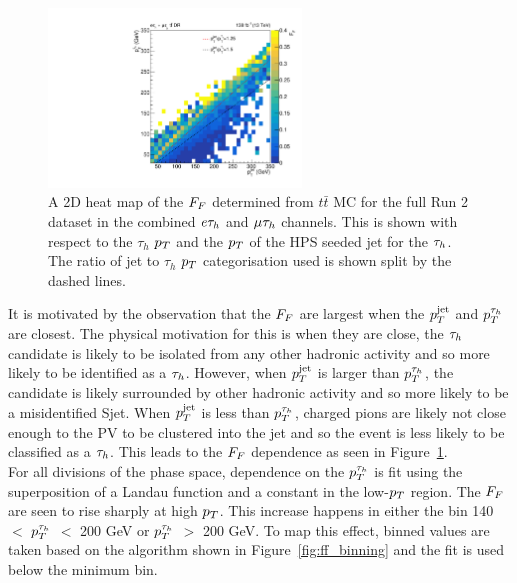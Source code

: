 \begin{figure}[t]
\centering
    \includegraphics[width=0.6\textwidth]{Figures/ff_colz_ttbar_lt_v2.pdf}
\caption[Plot of the reliance of the fake factors on the ratio of the $\tauh$ and jet $\pT$.]{A 2D heat map of the $F_{F}$ determined from $t\bar{t}$ MC for the full Run 2 dataset in the combined $e\tau_{h}$ and $\mu\tau_{h}$ channels. This is shown with respect to the $\tau_h$ $\pT$ and the $\pT$ of the HPS seeded jet for the $\tauh$. The ratio of jet to $\tau_h$ $\pT$ categorisation used is shown split by the dashed lines.}
\label{fig:ff_colz}
\end{figure}

It is motivated by the observation that the $F_{F}$ are largest when the $p_{T}^{\text{jet}}$ and $p_{T}^{\tau_{h}}$ are closest.
The physical motivation for this is when they are close, the $\tauh$ candidate is likely to be isolated from any other hadronic activity and so more likely to be identified as a $\tauh$.
However, when $p_{T}^{\text{jet}}$ is larger than $p_{T}^{\tau_{h}}$, the candidate is likely surrounded by other hadronic activity and so more likely to be a misidentified Sjet.
When $p_{T}^{\text{jet}}$ is less than $p_{T}^{\tau_{h}}$, charged pions are likely not close enough to the \ac{PV} to be clustered into the jet and so the event is less likely to be classified as a $\tauh$. 
This leads to the $F_{F}$ dependence as seen in Figure~\ref{fig:ff_colz}.\\

For all divisions of the phase space, dependence on the $p_{T}^{\tau_{h}}$ is fit using the superposition of a Landau function and a constant in the low-$\pT$ region.
The $F_{F}$ are seen to rise sharply at high $\pT$.
This increase happens in either the bin 140 $<$ $p_{T}^{\tau_{h}}$ $<$ 200 GeV or $p_{T}^{\tau_{h}}$ $>$ 200 GeV.
To map this effect, binned values are taken based on the algorithm shown in Figure~\ref{fig:ff_binning} and the fit is used below the minimum bin. \\

